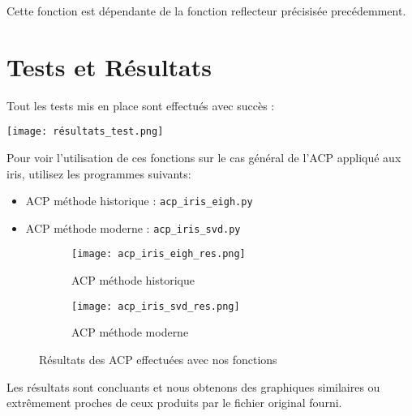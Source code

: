 \documentclass{article}
\begin{document}
Cette fonction est dépendante de la fonction reflecteur précisisée precédemment.

\section{Tests et Résultats}

Tout les tests mis en place sont effectués avec succès :

\begin{center} 
\texttt{[image: résultats\_test.png]}
\end{center} 

Pour voir l'utilisation de ces fonctions sur le cas général de l'ACP appliqué aux iris, utilisez les programmes suivants:

\begin{itemize}
\item ACP méthode historique : \texttt{acp\_iris\_eigh.py}
\item ACP méthode moderne : \texttt{acp\_iris\_svd.py}
\end{itemize}

\begin{figure}
\centering
\begin{subfigure}{.5\textwidth}
  \centering
  \texttt{[image: acp\_iris\_eigh\_res.png]}
  \caption{ACP méthode historique}
  \label{fig:sub1}
\end{subfigure}%
\begin{subfigure}{.5\textwidth}
  \centering
  \texttt{[image: acp\_iris\_svd\_res.png]}
  \caption{ACP méthode moderne}
  \label{fig:sub2}
\end{subfigure}
\caption{Résultats des ACP effectuées avec nos fonctions}
\label{fig:test}
\end{figure}


Les résultats sont concluants et nous obtenons des graphiques similaires ou extrêmement proches de ceux produits par le fichier original fourni.
\end{document}
